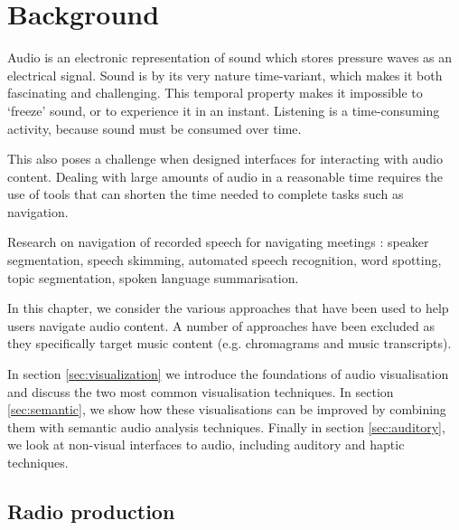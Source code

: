 \chapter{Background}\label{chp:background}

Audio is an electronic representation of sound which stores pressure waves as an electrical signal.
Sound is by its very nature time-variant, which makes it both fascinating and challenging.
This temporal property makes it impossible to `freeze' sound, or to experience it in an instant. Listening is a
time-consuming activity, because sound must be consumed over time.



This also poses a challenge when designed interfaces for interacting with audio content. Dealing with large amounts of
audio in a reasonable time requires the use of tools that can shorten the time needed to complete tasks such as
navigation.

Research on navigation of recorded speech for navigating meetings \citep{Bouamrane2007}: speaker segmentation, speech
skimming, automated speech recognition, word spotting, topic segmentation, spoken language summarisation.

In this chapter, we consider the various approaches that have been used to help users navigate audio content.
A number of approaches have been excluded as they specifically target music content (e.g. chromagrams and music
transcripts).

In section \ref{sec:visualization} we introduce the foundations of audio visualisation and discuss the two most common
visualisation techniques. In section \ref{sec:semantic}, we show how these visualisations can be improved by combining
them with semantic audio analysis techniques. Finally in section \ref{sec:auditory}, we look at non-visual interfaces
to audio, including auditory and haptic techniques.

\section{Radio production}\label{sec:background-radio}

